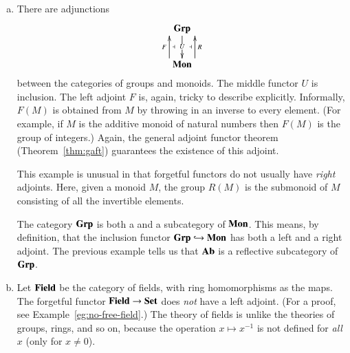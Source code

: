 \begin{examples}
\begin{enumerate}[(b)]
(To construct $\abel{G}$, let $G'$ be the smallest normal subgroup of $G$
containing $xyx^{-1}y^{-1}$ for all $x, y \in G$, and put $\abel{G} =
G/G'$.  The kernel of any homomorphism from $G$ to an abelian group
contains $G'$, and the universal property follows.)

\item
\label{eg:adjns-alg:gp-mon}
There are adjunctions
\[
\xymatrix{
\Grp \ar[d]|{U\vphantom{gl'}}	\\
\Mon \ar@<3ex>[u]^F_\ladj \ar@<-3ex>[u]_R^\ladj
}
%
\index{group!free on monoid}%
\index{monoid!free group on}
\]
between the categories of groups and monoids.  The middle functor $U$ is
inclusion.  The left adjoint $F$ is, again, tricky to describe explicitly.
Informally, $F(M)$ is obtained from $M$ by throwing in an inverse to every
element.  (For example, if $M$ is the additive monoid of natural numbers
then $F(M)$ is the group of integers.)  Again, the general adjoint functor
theorem (Theorem~\ref{thm:gaft}) guarantees the existence of this adjoint.

This example is unusual in that forgetful functors do not usually have
\emph{right} adjoints.  Here, given a monoid $M$, the group $R(M)$ is the
submonoid of $M$ consisting of all the invertible elements.

The category $\mathbf{Grp}$ is both a %
%
%
%
and a %
%
%
subcategory of $\mathbf{Mon}$.  This means, by definition, that the inclusion
functor $\mathbf{Grp} \hookrightarrow \mathbf{Mon}$ has both a left and a right adjoint.  The
previous example tells us that $\mathbf{Ab}$ is a reflective subcategory of $\mathbf{Grp}$.

\item
\label{egs:adjns-alg:fields}
Let $\mathbf{Field}$%
%
%
be the category of fields,%
%
%
with ring homomorphisms as the maps.  The forgetful functor $\mathbf{Field} \to \mathbf{Set}$
does \emph{not} have a left adjoint.  (For a proof, see
Example~\ref{eg:no-free-field}.)  The theory of fields is unlike the
theories of groups, rings, and so on, because the operation $x \mapsto
x^{-1}$ is not defined for \emph{all} $x$ (only for $x \neq 0$).
%
%
\end{enumerate}
\end{examples}

